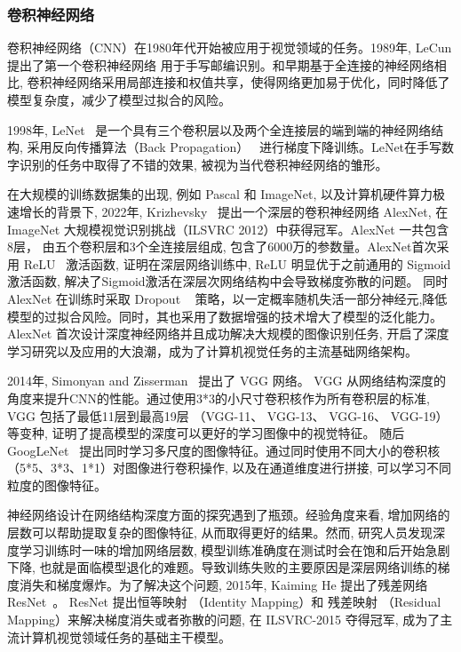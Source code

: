 \subsubsection{卷积神经网络}
卷积神经网络（CNN）在1980年代开始被应用于视觉领域的任务。1989年, LeCun 提出了第一个卷积神经网络\cite{lecun1989backpropagation} 用于手写邮编识别。和早期基于全连接的神经网络相比, 卷积神经网络采用局部连接和权值共享，使得网络更加易于优化，同时降低了模型复杂度，减少了模型过拟合的风险。\par
1998年, LeNet~\cite{lecun1998gradient} 是一个具有三个卷积层以及两个全连接层的端到端的神经网络结构, 采用反向传播算法（Back Propagation）~\cite{rumelhart1986learning} 进行梯度下降训练。LeNet在手写数字识别的任务中取得了不错的效果, 被视为当代卷积神经网络的雏形。\par
在大规模的训练数据集的出现, 例如 Pascal 和 ImageNet, 以及计算机硬件算力极速增长的背景下, 2022年, Krizhevsky~\cite{krizhevsky2017imagenet} 提出一个深层的卷积神经网络 AlexNet, 在ImageNet 大规模视觉识别挑战（ILSVRC 2012）中获得冠军。AlexNet 一共包含8层， 由五个卷积层和3个全连接层组成, 包含了6000万的参数量。AlexNet首次采用 ReLU~\cite{glorot2011deep} 激活函数, 证明在深层网络训练中, ReLU 明显优于之前通用的 Sigmoid 激活函数, 解决了Sigmoid激活在深层次网络结构中会导致梯度弥散的问题。 同时AlexNet 在训练时采取 Dropout ~\cite{srivastava2014dropout} 策略，以一定概率随机失活一部分神经元,降低模型的过拟合风险。同时，其也采用了数据增强的技术增大了模型的泛化能力。AlexNet 首次设计深度神经网络并且成功解决大规模的图像识别任务, 开启了深度学习研究以及应用的大浪潮，成为了计算机视觉任务的主流基础网络架构。 \par
2014年, Simonyan and Zisserman~\cite{simonyan2014very} 提出了 VGG 网络。 VGG 从网络结构深度的角度来提升CNN的性能。通过使用3*3的小尺寸卷积核作为所有卷积层的标准, VGG 包括了最低11层到最高19层 （VGG-11、 VGG-13、 VGG-16、 VGG-19）等变种, 证明了提高模型的深度可以更好的学习图像中的视觉特征。 随后 GoogLeNet~\cite{szegedy2015going} 提出同时学习多尺度的图像特征。通过同时使用不同大小的卷积核（5*5、3*3、1*1）对图像进行卷积操作, 以及在通道维度进行拼接, 可以学习不同粒度的图像特征。\par
神经网络设计在网络结构深度方面的探究遇到了瓶颈。经验角度来看, 增加网络的层数可以帮助提取复杂的图像特征, 从而取得更好的结果。然而, 研究人员发现深度学习训练时一味的增加网络层数, 模型训练准确度在测试时会在饱和后开始急剧下降, 也就是面临模型退化的难题。导致训练失败的主要原因是深层网络训练的梯度消失和梯度爆炸。为了解决这个问题, 2015年, Kaiming He 提出了残差网络 ResNet~\cite{he2016deep}。 ResNet 提出恒等映射 （Identity Mapping）和 残差映射 （Residual Mapping）来解决梯度消失或者弥散的问题, 在 ILSVRC-2015 夺得冠军, 成为了主流计算机视觉领域任务的基础主干模型。\par

